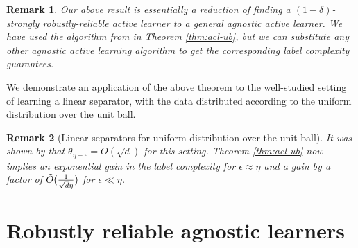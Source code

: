 \documentclass[11pt]{article}
\newtheorem{remark}{Remark}
\newcommand{\0}{\mathbf{0}}
\newcommand{\1}{\mathbf{1}}
\begin{document}
\begin{remark}
Our above result is essentially a reduction of finding a $(1-\delta)$-strongly robustly-reliable active learner to a general agnostic active learner. We have used the algorithm from \cite{dasgupta2007general} in Theorem \ref{thm:acl-ub}, but we can substitute any other agnostic active learning algorithm to get the corresponding label complexity guarantees.
\end{remark}





We demonstrate an application of the above theorem to the well-studied setting of learning a linear separator, with the data distributed according to the uniform distribution over the unit ball.

\begin{remark}[Linear separators for uniform distribution over the unit ball]
It was shown by \cite{hanneke2007bound} that
$\theta_{\eta+\epsilon}=O(\sqrt{d})$ for this setting.
Theorem \ref{thm:acl-ub} now implies an exponential gain in the label complexity for $\epsilon\approx \eta$ and a gain by a factor of $\Tilde{O}(\frac{1}{\sqrt{d}\eta})$ for $\epsilon\ll \eta$.
\end{remark}



\section{Robustly reliable agnostic learners}\label{sec:non-realizable}
\end{document}

